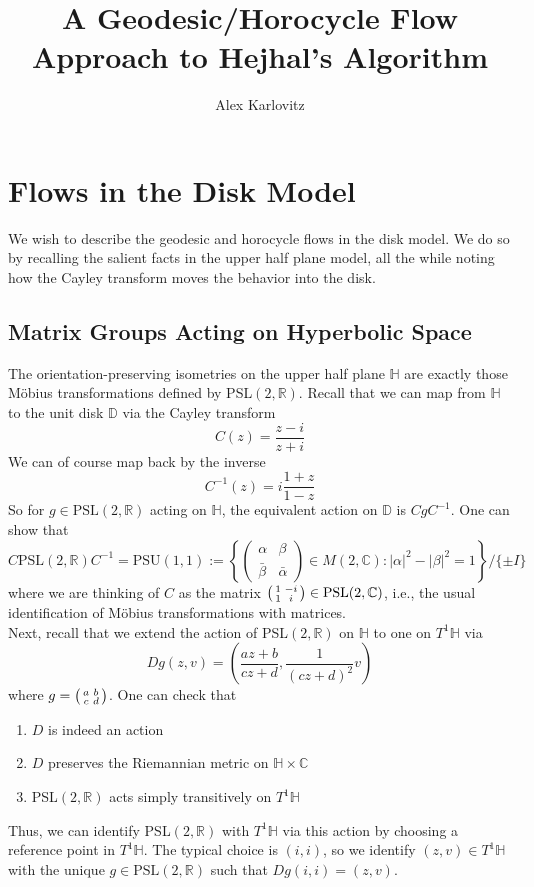 \documentclass[]{article}
\title{A Geodesic/Horocycle Flow Approach to Hejhal's Algorithm}
\author{Alex Karlovitz}
\date{}
\begin{document}
	
	\maketitle
	
\section*{Flows in the Disk Model}

We wish to describe the geodesic and horocycle flows in the disk model.
We do so by recalling the salient facts in the upper half plane model, all the while noting how the Cayley transform moves the behavior into the disk.

\subsection*{Matrix Groups Acting on Hyperbolic Space}

The orientation-preserving isometries on the upper half plane $\mathbb{H}$ are exactly those M\"obius transformations defined by PSL$(2, \mathbb{R})$.
Recall that we can map from $\mathbb{H}$ to the unit disk $\mathbb{D}$ via the Cayley transform
$$
C(z) = \frac{z - i}{z + i}
$$
We can of course map back by the inverse
$$
C^{-1}(z) = i\frac{1 + z}{1 - z}
$$
So for $g \in \text{PSL}(2, \mathbb{R})$ acting on $\mathbb{H}$, the equivalent action on $\mathbb{D}$ is $CgC^{-1}$.
One can show that
$$
C\text{PSL}(2, \mathbb{R})C^{-1} = \text{PSU}(1, 1) :=
\left\{ 
\begin{pmatrix}
\alpha & \beta \\
\bar{\beta} & \bar{\alpha}
\end{pmatrix} \in M(2, \mathbb{C}) : |\alpha|^2 - |\beta|^2 = 1
\right\} / \{\pm I\}
$$
where we are thinking of $C$ as the matrix $\begin{psmallmatrix} 1 & -i \\ 1 & i \end{psmallmatrix} \in \text{PSL}(2, \mathbb{C})$, i.e., the usual identification of M\"obius transformations with matrices.
\\

Next, recall that we extend the action of PSL$(2, \mathbb{R})$ on $\mathbb{H}$ to one on $T^1\mathbb{H}$ via
$$
Dg(z, v) = \left( \frac{az + b}{cz + d}, \frac{1}{(cz + d)^2}v \right)
$$
where $g = \begin{psmallmatrix} a & b \\ c & d \end{psmallmatrix}$.
One can check that
\begin{enumerate}
	\item $D$ is indeed an action
	\item $D$ preserves the Riemannian metric on $\mathbb{H} \times \mathbb{C}$
	\item PSL$(2, \mathbb{R})$ acts simply transitively on $T^1\mathbb{H}$
\end{enumerate}
Thus, we can identify PSL$(2, \mathbb{R})$ with $T^1\mathbb{H}$ via this action by choosing a reference point in $T^1\mathbb{H}$.
The typical choice is $(i, i)$, so we identify $(z, v) \in T^1\mathbb{H}$ with the unique $g \in \text{PSL}(2, \mathbb{R})$ such that $Dg(i, i) = (z, v)$.
\\
\end{document}
